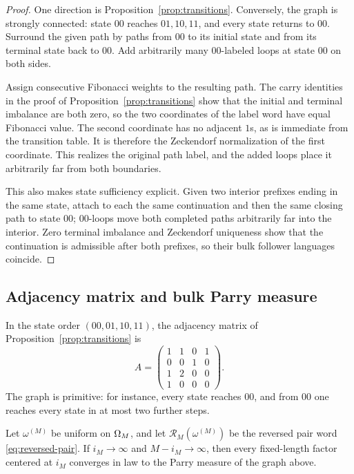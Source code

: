 \begin{proof}
One direction is Proposition~\ref{prop:transitions}. Conversely, the graph is strongly connected: state \(00\) reaches \(01,10,11\), and every state returns to \(00\). Surround the given path by paths from \(00\) to its initial state and from its terminal state back to \(00\). Add arbitrarily many \(00\)-labeled loops at state \(00\) on both sides.

Assign consecutive Fibonacci weights to the resulting path. The carry identities in the proof of Proposition~\ref{prop:transitions} show that the initial and terminal imbalance are both zero, so the two coordinates of the label word have equal Fibonacci value. The second coordinate has no adjacent \(1\)s, as is immediate from the transition table. It is therefore the Zeckendorf normalization of the first coordinate. This realizes the original path label, and the added loops place it arbitrarily far from both boundaries.

This also makes state sufficiency explicit. Given two interior prefixes ending in the same state, attach to each the same continuation and then the same closing path to state \(00\); \(00\)-loops move both completed paths arbitrarily far into the interior. Zero terminal imbalance and Zeckendorf uniqueness show that the continuation is admissible after both prefixes, so their bulk follower languages coincide.
\end{proof}

\subsection{Adjacency matrix and bulk Parry measure}
In the state order \((00,01,10,11)\), the adjacency matrix of Proposition~\ref{prop:transitions} is
\[
A=
\begin{pmatrix}
1&1&0&1\\
0&0&1&0\\
1&2&0&0\\
1&0&0&0
\end{pmatrix}.
\]
The graph is primitive: for instance, every state reaches \(00\), and from \(00\) one reaches every state in at most two further steps.

\begin{proposition}\label{prop:bulk-limit}
Let \(\omega^{(M)}\) be uniform on \(\Omega_M\), and let \(\mathcal{R}_M(\omega^{(M)})\) be the reversed pair word \eqref{eq:reversed-pair}. If \(i_M\to\infty\) and \(M-i_M\to\infty\), then every fixed-length factor centered at \(i_M\) converges in law to the Parry measure of the graph above.
\end{proposition}

